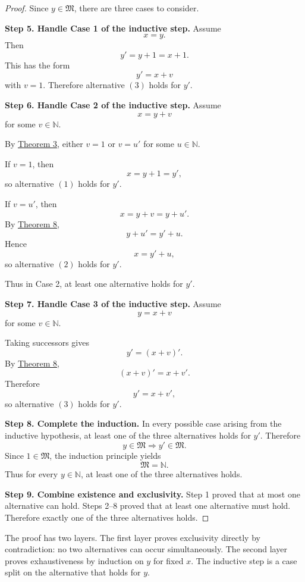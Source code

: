 \begin{proof}
Since \(y\in\mathfrak{M}\), there are three cases to consider.

\textbf{Step 5. Handle Case 1 of the inductive step.}
Assume
\[
x=y.
\]
Then
\[
y'=y+1=x+1.
\]
This has the form
\[
y'=x+v
\]
with \(v=1\). Therefore alternative \((3)\) holds for \(y'\).

\textbf{Step 6. Handle Case 2 of the inductive step.}
Assume
\[
x=y+v
\]
for some \(v\in\mathbb{N}\).

By \hyperref[thm:every-natural-number-is-one-or-a-successor]{Theorem 3}, either \(v=1\) or \(v=u'\) for some \(u\in\mathbb{N}\).

If \(v=1\), then
\[
x=y+1=y',
\]
so alternative \((1)\) holds for \(y'\).

If \(v=u'\), then
\[
x=y+v=y+u'.
\]
By \hyperref[thm:successor-addition-rule]{Theorem 8},
\[
y+u'=y'+u.
\]
Hence
\[
x=y'+u,
\]
so alternative \((2)\) holds for \(y'\).

Thus in Case 2, at least one alternative holds for \(y'\).

\textbf{Step 7. Handle Case 3 of the inductive step.}
Assume
\[
y=x+v
\]
for some \(v\in\mathbb{N}\).

Taking successors gives
\[
y'=(x+v)'.
\]
By \hyperref[thm:successor-addition-rule]{Theorem 8},
\[
(x+v)'=x+v'.
\]
Therefore
\[
y'=x+v',
\]
so alternative \((3)\) holds for \(y'\).

\textbf{Step 8. Complete the induction.}
In every possible case arising from the inductive hypothesis, at least one of the three alternatives holds for \(y'\). Therefore
\[
y\in\mathfrak{M}\Longrightarrow y'\in\mathfrak{M}.
\]
Since \(1\in\mathfrak{M}\), the induction principle yields
\[
\mathfrak{M}=\mathbb{N}.
\]
Thus for every \(y\in\mathbb{N}\), at least one of the three alternatives holds.

\textbf{Step 9. Combine existence and exclusivity.}
Step 1 proved that at most one alternative can hold. Steps 2--8 proved that at least one alternative must hold. Therefore exactly one of the three alternatives holds.
\end{proof}

\begin{remark*}
The proof has two layers. The first layer proves exclusivity directly by contradiction: no two alternatives can occur simultaneously. The second layer proves exhaustiveness by induction on \(y\) for fixed \(x\). The inductive step is a case split on the alternative that holds for \(y\).
\end{remark*}

